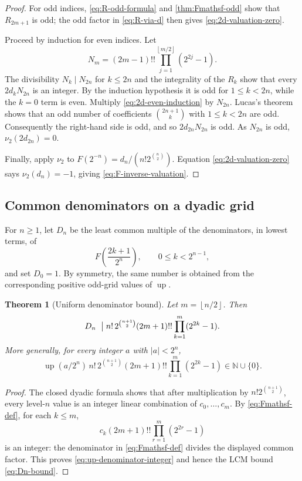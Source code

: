 \documentclass[11pt,oneside]{article}
\newtheorem{theorem}{Theorem}[section]
\theoremstyle{definition}
\theoremstyle{remark}
\newcommand{\upf}{\operatorname{up}}
\newcommand{\N}{\mathbb N}
\newcommand{\floor}[1]{\left\lfloor#1\right\rfloor}
\begin{document}
\begin{proof}
For odd indices, \eqref{eq:R-odd-formula} and
\cref{thm:Fmathsf-odd} show that $R_{2m+1}$ is odd; the odd factor in
\eqref{eq:R-via-d} then gives \eqref{eq:2d-valuation-zero}.

Proceed by induction for even indices.  Let
\[
 N_m=(2m-1)!!\prod_{j=1}^{\floor{m/2}}(2^{2j}-1).
\]
The divisibility $N_k\mid N_{2n}$ for $k\le2n$ and the integrality of the $R_k$
show that every $2d_kN_{2n}$ is an integer.  By the induction hypothesis it is odd
for $1\le k<2n$, while the $k=0$ term is even.  Multiply
\eqref{eq:2d-even-induction} by $N_{2n}$.  Lucas's theorem shows that an odd number
of coefficients $\binom{2n+1}{k}$ with $1\le k<2n$ are odd.  Consequently the
right-hand side is odd, and so $2d_{2n}N_{2n}$ is odd.  As $N_{2n}$ is odd,
$\nu_2(2d_{2n})=0$.

Finally, apply $\nu_2$ to
$F(2^{-n})=d_n/(n!2^{\binom n2})$.  Equation
\eqref{eq:2d-valuation-zero} says $\nu_2(d_n)=-1$, giving
\eqref{eq:F-inverse-valuation}.
\end{proof}

\subsection{Common denominators on a dyadic grid}

For $n\ge1$, let $D_n$ be the least common multiple of the denominators, in lowest
terms, of
\begin{equation}\label{eq:Dn-set}
  F\left(\frac{2k+1}{2^n}\right),
  \qquad 0\le k<2^{n-1},
\end{equation}
and set $D_0=1$.  By symmetry, the same number is obtained from the corresponding
positive odd-grid values of $\upf$.

\begin{theorem}[Uniform denominator bound]\label{thm:denominator-bound}
Let $m=\floor{n/2}$.  Then
\begin{equation}\label{eq:Dn-bound}
 D_n\ \bigm|
 n!\,2^{\binom{n+1}{2}}(2m+1)!!
 \prod_{k=1}^{m}(2^{2k}-1).
\end{equation}
More generally, for every integer $a$ with $|a|<2^n$,
\begin{equation}\label{eq:up-denominator-integer}
 \upf(a/2^n)\,
 n!\,2^{\binom{n+1}{2}}(2m+1)!!
 \prod_{k=1}^{m}(2^{2k}-1)
 \in\N\cup\{0\}.
\end{equation}
\end{theorem}

\begin{proof}
The closed dyadic formula shows that after multiplication by
$n!2^{\binom{n+1}{2}}$, every level-$n$ value is an integer linear combination of
$c_0,\ldots,c_m$.  By \eqref{eq:Fmathsf-def}, for each $k\le m$,
\[
 c_k(2m+1)!!\prod_{r=1}^m(2^{2r}-1)
\]
is an integer: the denominator in \eqref{eq:Fmathsf-def} divides the displayed
common factor.  This proves \eqref{eq:up-denominator-integer} and hence the LCM
bound \eqref{eq:Dn-bound}.
\end{proof}
\end{document}
